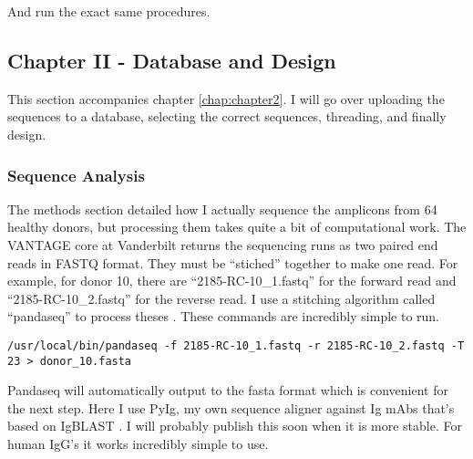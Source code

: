 And run the exact same procedures.

\subsection{Chapter II - Database and Design}
This section accompanies chapter \ref{chap:chapter2}. I will go over uploading the sequences to a database, selecting the correct sequences, threading, and finally design.

\subsubsection{Sequence Analysis}
The methods section detailed how I actually sequence the amplicons from 64 healthy donors, but processing them takes quite a bit of computational work. The VANTAGE core at Vanderbilt returns the sequencing runs as two paired end reads in FASTQ format. They must be ``stiched'' together to make one read. For example, for donor 10, there are ``2185-RC-10\_1.fastq'' for the forward read and ``2185-RC-10\_2.fastq'' for the reverse read. I use a stitching algorithm called ``pandaseq'' to process theses \citep{Bartram:2011cz}. These commands are incredibly simple to run.

\begin{lstlisting}[breaklines=true]
/usr/local/bin/pandaseq -f 2185-RC-10_1.fastq -r 2185-RC-10_2.fastq -T 23 > donor_10.fasta
\end{lstlisting}

Pandaseq will automatically output to the fasta format which is convenient for the next step. Here I use PyIg, my own sequence aligner against Ig mAbs that's based on IgBLAST \citep{Ye:2013bb}. I will probably publish this soon when it is more stable. For human IgG's it works incredibly simple to use.

